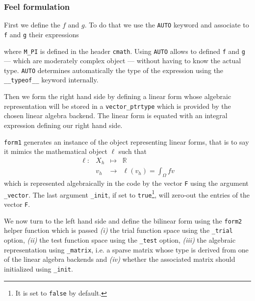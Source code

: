 \documentclass[a4paper]{book}
\begin{document}
\subsubsection{Feel formulation}
\label{sec:feel-formulation-1}

First we define the $f$ and $g$. To do that we use the
\lstinline!AUTO! keyword and associate to \lstinline!f! and
\lstinline!g! their expressions



\noindent where \lstinline!M_PI! is defined in the header
\lstinline!cmath!.  Using \lstinline!AUTO! allows to defined
\lstinline!f!  and \lstinline!g! --- which are moderately complex
object --- without having to know the actual type. \lstinline!AUTO!
determines automatically the type of the expression using the
\lstinline!__typeof__! keyword internally.

Then we form the right hand side by defining a linear form whose
algebraic representation will be stored in a
\lstinline!vector_ptrtype! which is provided by the chosen linear
algebra backend. The linear form is equated with an integral
expression defining our right hand side.



\noindent \lstinline!form1! generates an instance of the object
representing linear forms, that is to say it mimics the mathematical
object $\ell$ such that
\begin{equation}
  \label{eq:9}
  \begin{array}{rccl}
    \ell: & X_h & \mapsto & \mathbb{R}\\
    & v_h & \rightarrow &\ell(v_h)=\int_\Omega f v
  \end{array}
\end{equation}
which is represented algebraically in the code by the vector
\lstinline!F! using the argument \lstinline!_vector!. The last
argument \lstinline!_init!, if set to \lstinline!true!\footnote{It is
  set to \lstinline!false! by default.}, will zero-out the entries of
the vector \lstinline!F!.


We now turn to the left hand side and define the bilinear form using
the \lstinline!form2! helper function which is passed \textit{(i)} the
trial function space using the \lstinline!_trial! option,
\textit{(ii)} the test function space using the \lstinline!_test!
option, \textit{(iii)} the algebraic representation using
\lstinline!_matrix!, i.e. a sparse matrix whose type is derived from
one of the linear algebra backends and \textit{(iv)} whether the
associated matrix should initialized using
\lstinline!_init!.
\end{document}
